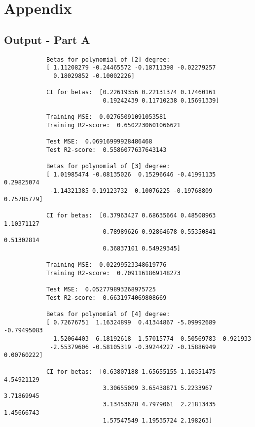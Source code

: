 \section{Appendix}

\subsection{Output - Part A}
\label{chap:Output - Part A}
\begin{verbatim}
            Betas for polynomial of [2] degree:  
            [ 1.11208279 -0.24465572 -0.18711398 -0.02279257
              0.18029852 -0.10002226] 
            
            CI for betas:  [0.22619356 0.22131374 0.17460161 
                            0.19242439 0.11710238 0.15691339]
                            
            Training MSE:  0.02765091091053581
            Training R2-score:  0.6502230601066621 
            
            Test MSE:  0.06916999928486468
            Test R2-score:  0.5586077637643143 
            
            Betas for polynomial of [3] degree:  
            [ 1.01985474 -0.08135026  0.15296646 -0.41991135  0.29825074 
             -1.14321385 0.19123732  0.10076225 -0.19768809  0.75785779]
             
            CI for betas:  [0.37963427 0.68635664 0.48508963 1.10371127 
                            0.78989626 0.92864678 0.55350841 0.51302814 
                            0.36837101 0.54929345]
                            
            Training MSE:  0.02299523348619776
            Training R2-score:  0.7091161869148273 
            
            Test MSE:  0.052779893268975725
            Test R2-score:  0.6631974069808669
            
            Betas for polynomial of [4] degree:  
            [ 0.72676751  1.16324899  0.41344867 -5.09992689 -0.79495083 
             -1.52064403  6.18192618  1.57015774  0.50569783  0.921933   
             -2.55379606 -0.58105319 -0.39244227 -0.15886949  0.00760222] 
            
            CI for betas:  [0.63807188 1.65655155 1.16351475 4.54921129 
                            3.30655009 3.65438871 5.2233967  3.71869945 
                            3.13453628 4.7979061  2.21813435 1.45666743
                            1.57547549 1.19535724 2.198263]
                            

\end{verbatim}
